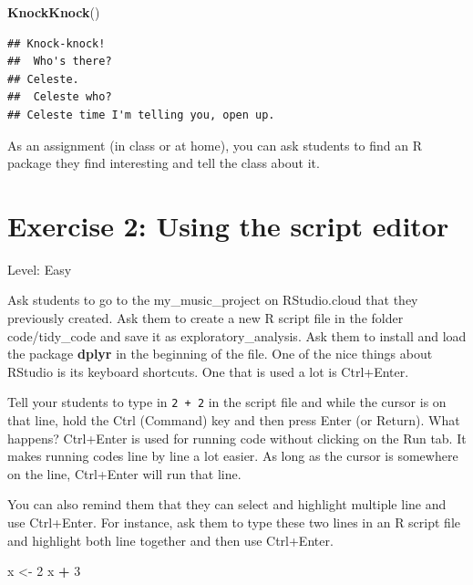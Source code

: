 \documentclass[]{book}
\newenvironment{Shaded}{\begin{snugshade}}{\end{snugshade}}
\newcommand{\DecValTok}[1]{\textcolor[rgb]{0.00,0.00,0.81}{#1}}
\newcommand{\KeywordTok}[1]{\textcolor[rgb]{0.13,0.29,0.53}{\textbf{#1}}}
\newcommand{\NormalTok}[1]{#1}
\newcommand{\OperatorTok}[1]{\textcolor[rgb]{0.81,0.36,0.00}{\textbf{#1}}}
\newcommand{\StringTok}[1]{\textcolor[rgb]{0.31,0.60,0.02}{#1}}
\begin{document}
\begin{Shaded}
\begin{Highlighting}[]
\KeywordTok{KnockKnock}\NormalTok{()}
\end{Highlighting}
\end{Shaded}

\begin{verbatim}
## Knock-knock!
##  Who's there?
## Celeste.
##  Celeste who?
## Celeste time I'm telling you, open up.
\end{verbatim}

As an assignment (in class or at home), you can ask students to find an R package they find interesting and tell the class about it.

\hypertarget{exercise-2-using-the-script-editor}{%
\section*{Exercise 2: Using the script editor}\label{exercise-2-using-the-script-editor}}

Level: Easy

Ask students to go to the my\_music\_project on RStudio.cloud that they previously created. Ask them to create a new R script file in the folder code/tidy\_code and save it as exploratory\_analysis. Ask them to install and load the package \textbf{dplyr} in the beginning of the file. One of the nice things about RStudio is its keyboard shortcuts. One that is used a lot is Ctrl+Enter.

Tell your students to type in \texttt{2\ +\ 2} in the script file and while the cursor is on that line, hold the Ctrl (Command) key and then press Enter (or Return). What happens? Ctrl+Enter is used for running code without clicking on the Run tab. It makes running codes line by line a lot easier. As long as the cursor is somewhere on the line, Ctrl+Enter will run that line.

You can also remind them that they can select and highlight multiple line and use Ctrl+Enter. For instance, ask them to type these two lines in an R script file and highlight both line together and then use Ctrl+Enter.

\begin{Shaded}
\begin{Highlighting}[]
\NormalTok{x <-}\StringTok{ }\DecValTok{2}
\NormalTok{x }\OperatorTok{+}\StringTok{ }\DecValTok{3}
\end{Highlighting}
\end{Shaded}
\end{document}
